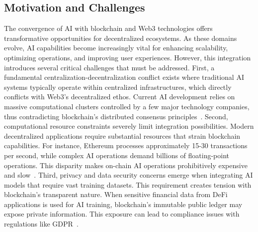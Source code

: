\documentclass[5p,twocolumn]{elsarticle}
\begin{document}
\subsection{Motivation and Challenges}
The convergence of AI with blockchain and Web3 technologies offers transformative opportunities for decentralized ecosystems. As these domains evolve, AI capabilities become increasingly vital for enhancing scalability, optimizing operations, and improving user experiences. However, this integration introduces several critical challenges that must be addressed. First, a fundamental centralization-decentralization conflict exists where traditional AI systems typically operate within centralized infrastructures, which directly conflicts with Web3's decentralized ethos. Current AI development relies on massive computational clusters controlled by a few major technology companies, thus contradicting blockchain's distributed consensus principles~\cite{choi2025technological}. Second, computational resource constraints severely limit integration possibilities. Modern decentralized applications require substantial resources that strain blockchain capabilities. For instance, Ethereum processes approximately 15-30 transactions per second, while complex AI operations demand billions of floating-point operations. This disparity makes on-chain AI operations prohibitively expensive and slow~\cite{feng2025efficient}. Third, privacy and data security concerns emerge when integrating AI models that require vast training datasets. This requirement creates tension with blockchain's transparent nature. When sensitive financial data from DeFi applications is used for AI training, blockchain's immutable public ledger may expose private information. This exposure can lead to compliance issues with regulations like GDPR~\cite{savadatti2025survey}. 
\end{document}
